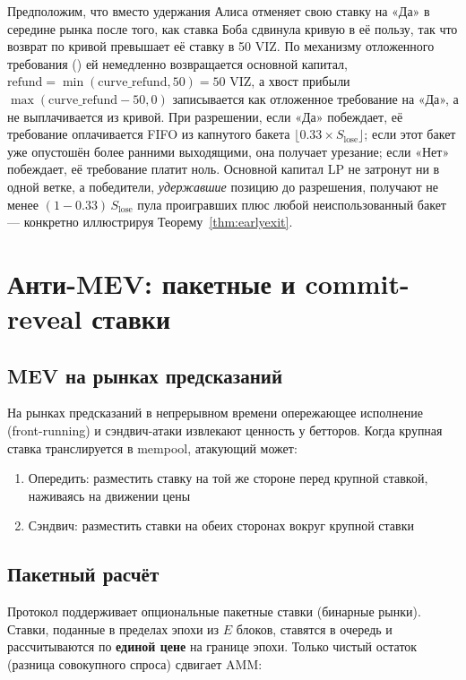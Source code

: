 \documentclass{ledger}
\theoremstyle{plain}
\theoremstyle{remark}
\begin{document}
Предположим, что вместо удержания Алиса отменяет свою ставку на «Да» в середине
рынка после того, как ставка Боба сдвинула кривую в её пользу, так что возврат по
кривой превышает её ставку в 50 VIZ. По механизму отложенного требования
() ей немедленно возвращается основной капитал,
$\text{refund} = \min(\text{curve\_refund}, 50) = 50$ VIZ, а хвост прибыли
$\max(\text{curve\_refund} - 50, 0)$ записывается как отложенное требование на «Да»,
а не выплачивается из кривой. При разрешении, если «Да» побеждает, её требование
оплачивается FIFO из капнутого бакета $\lfloor 0.33 \times S_{\text{lose}} \rfloor$;
если этот бакет уже опустошён более ранними выходящими, она получает урезание; если
«Нет» побеждает, её требование платит ноль. Основной капитал LP не затронут ни в
одной ветке, а победители, \emph{удержавшие} позицию до разрешения, получают не менее
$(1 - 0.33)\,S_{\text{lose}}$ пула проигравших плюс любой неиспользованный бакет ---
конкретно иллюстрируя Теорему~\ref{thm:earlyexit}.

\section{Анти-MEV: пакетные и commit-reveal ставки}\label{sec:antimev}

\subsection{MEV на рынках предсказаний}

На рынках предсказаний в непрерывном времени опережающее исполнение (front-running)
и сэндвич-атаки извлекают ценность у бетторов. Когда крупная ставка транслируется в
mempool, атакующий может:

\begin{enumerate}
  \item Опередить: разместить ставку на той же стороне перед крупной ставкой,
  наживаясь на движении цены
  \item Сэндвич: разместить ставки на обеих сторонах вокруг крупной ставки
\end{enumerate}

\subsection{Пакетный расчёт}

Протокол поддерживает опциональные пакетные ставки (бинарные рынки). Ставки,
поданные в пределах эпохи из $E$ блоков, ставятся в очередь и рассчитываются по
\textbf{единой цене} на границе эпохи. Только чистый остаток (разница совокупного
спроса) сдвигает AMM:
\end{document}
